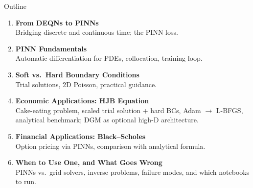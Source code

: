 \documentclass[aspectratio=169,11pt]{beamer}
\begin{document}
\begin{frame}{Outline}
\begin{enumerate}
    \item \textbf{From DEQNs to PINNs}\\
    {\small Bridging discrete and continuous time; the PINN loss.}

    \vspace{0.4em}
    \item \textbf{PINN Fundamentals}\\
    {\small Automatic differentiation for PDEs, collocation, training loop.}

    \vspace{0.4em}
    \item \textbf{Soft vs.\ Hard Boundary Conditions}\\
    {\small Trial solutions, 2D Poisson, practical guidance.}

    \vspace{0.4em}
    \item \textbf{Economic Applications: HJB Equation}\\
    {\small Cake-eating problem, scaled trial solution + hard BCs, Adam $\to$ L-BFGS, analytical benchmark; DGM as optional high-D architecture.}

    \vspace{0.4em}
    \item \textbf{Financial Applications: Black--Scholes}\\
    {\small Option pricing via PINNs, comparison with analytical formula.}

    \vspace{0.4em}
    \item \textbf{When to Use One, and What Goes Wrong}\\
    {\small PINNs vs.\ grid solvers, inverse problems, failure modes, and which notebooks to run.}
\end{enumerate}
\end{frame}
\end{document}
